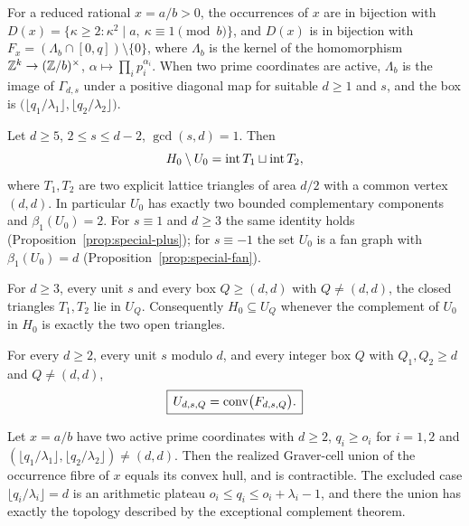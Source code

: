 \begin{theorem}
For a reduced rational $x=a/b>0$, the occurrences of $x$ are in bijection with $D(x)=\{\kappa\ge2:\kappa^2\mid a,\ \kappa\equiv1 \pmod b\}$, and $D(x)$ is in bijection with $F_x=(\Lambda_b\cap[0,q])\setminus\{0\}$, where $\Lambda_b$ is the kernel of the homomorphism $\mathbb Z^k\to(\mathbb Z/b)^\times$, $\alpha\mapsto\prod_i p_i^{\alpha_i}$. When two prime coordinates are active, $\Lambda_b$ is the image of $\Gamma_{d,s}$ under a positive diagonal map for suitable $d\ge1$ and $s$, and the box is $\bigl(\lfloor q_1/\lambda_1\rfloor,\lfloor q_2/\lambda_2\rfloor\bigr)$.
\end{theorem}

\begin{theorem}
Let $d\ge5$, $2\le s\le d-2$, $\gcd(s,d)=1$. Then
\[
  H_0\setminus U_0=\operatorname{int} T_1\sqcup\operatorname{int} T_2,
\]
where $T_1,T_2$ are two explicit lattice triangles of area $d/2$ with a common vertex $(d,d)$. In particular $U_0$ has exactly two bounded complementary components and $\beta_1(U_0)=2$. For $s\equiv 1$ and $d\ge3$ the same identity holds (Proposition~\ref{prop:special-plus}); for $s\equiv-1$ the set $U_0$ is a fan graph with $\beta_1(U_0)=d$ (Proposition~\ref{prop:special-fan}).
\end{theorem}

\begin{theorem}
For $d\ge3$, every unit $s$ and every box $Q\ge(d,d)$ with $Q\ne(d,d)$, the closed triangles $T_1,T_2$ lie in $U_Q$. Consequently $H_0\subseteq U_Q$ whenever the complement of $U_0$ in $H_0$ is exactly the two open triangles.
\end{theorem}

\begin{theorem}\label{thm:intro-main}
For every $d\ge 2$, every unit $s$ modulo $d$, and every integer box $Q$ with $Q_1,Q_2\ge d$ and $Q\ne(d,d)$,
\[
  \boxed{\,U_{d,s,Q}=\operatorname{conv}\bigl(F_{d,s,Q}\bigr).\,}
\]
\end{theorem}

\begin{corollary}
Let $x=a/b$ have two active prime coordinates with $d\ge2$, $q_i\ge o_i$ for $i=1,2$ and $(\lfloor q_1/\lambda_1\rfloor,\lfloor q_2/\lambda_2\rfloor)\neq(d,d)$. Then the realized Graver-cell union of the occurrence fibre of $x$ equals its convex hull, and is contractible. The excluded case $\lfloor q_i/\lambda_i\rfloor=d$ is an arithmetic plateau $o_i\le q_i\le o_i+\lambda_i-1$, and there the union has exactly the topology described by the exceptional complement theorem.
\end{corollary}

